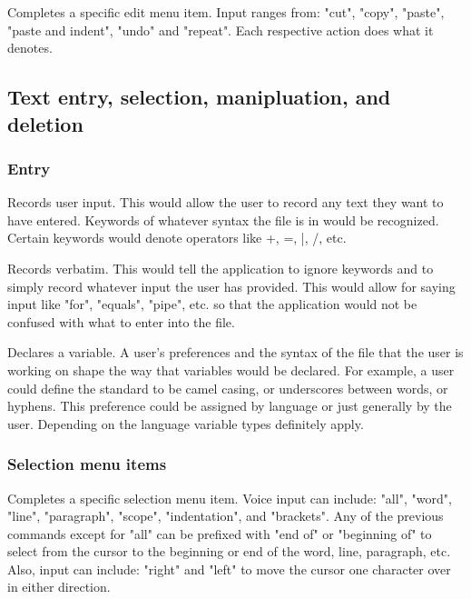 \documentclass[11pt, oneside]{article}
\newcounter{subsubsubsection}
\begin{document}
Completes a specific edit menu item. Input ranges from: "cut", "copy", "paste", "paste and indent",  "undo" and "repeat". Each respective action does what it denotes.

\subsection{Text entry, selection, manipluation, and deletion}

	\subsubsection{Entry}

		Records user input. This would allow the user to record any text they want to have entered. Keywords of whatever syntax the file is in would be recognized. Certain keywords would denote operators like +, =, |, /, etc. 

		Records verbatim. This would tell the application to ignore keywords and to simply record whatever input the user has provided. This would allow for saying input like "for", "equals", "pipe", etc. so that the application would not be confused with what to enter into the file.

		Declares a variable. A user's preferences and the syntax of the file that the user is working on shape the way that variables would be declared. For example, a user could define the standard to be camel casing, or underscores between words, or hyphens. This preference could be assigned by language or just generally by the user. Depending on the language variable types definitely apply.


	\subsubsection{Selection menu items \hfill {}}
	Completes a specific selection menu item. Voice input can include: "all", "word", "line", "paragraph", "scope", "indentation", and "brackets". Any of the previous commands except for "all" can be prefixed with "end of" or "beginning of" to select from the cursor to the beginning or end of the word, line, paragraph, etc. Also, input can include: "right" and "left" to move the cursor one character over in either direction.
\end{document}
